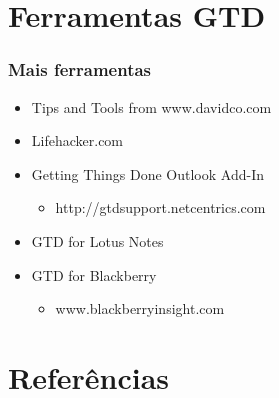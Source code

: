 \documentclass{beamer}
\begin{document}

\section{Ferramentas GTD} %
\label{sec:gtd_tools}

\begin{frame}[t]\frametitle{Mais ferramentas}
\begin{itemize}
	\item Tips and Tools from www.davidco.com
	\item Lifehacker.com
	\item Getting Things Done Outlook Add-In 
	\begin{itemize}
		\item http://gtdsupport.netcentrics.com
	\end{itemize}
	\item GTD for Lotus Notes
	\item GTD for Blackberry
	\begin{itemize}
		\item www.blackberryinsight.com
	\end{itemize}
\end{itemize}
\end{frame}

\section{Referências} %
\label{sec:references}

\end{document}
